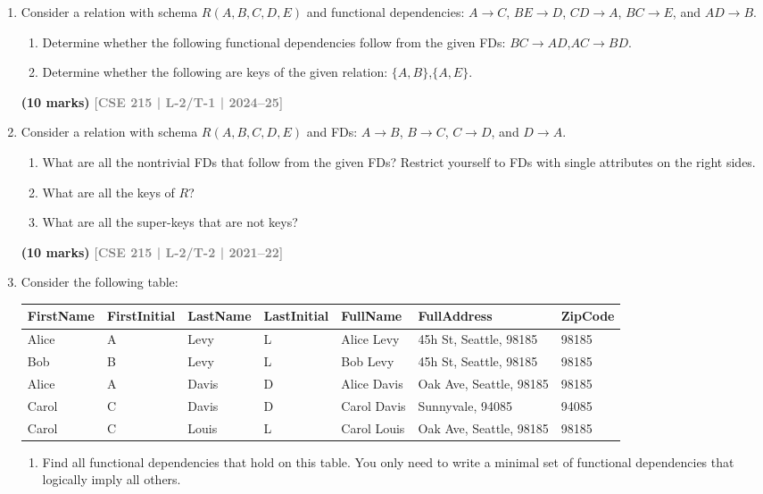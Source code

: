 \documentclass[12pt,a3paper]{article}
\newcommand{\yr}[1]{\hfill\textcolor{gray}{\small\textbf{[#1]}}}
\newcommand{\mk}[1]{\textcolor{orange!70!black}{\small\textbf{(#1 marks)}}}
\begin{document}
\begin{enumerate}

\item Consider a relation with schema $R(A,B,C,D,E)$ and functional dependencies: $A \to C$, $BE \to D$, $CD \to A$, $BC \to E$, and $AD \to B$.
\begin{enumerate}
  \item Determine whether the following functional dependencies follow from the given FDs: $BC \to AD$,\quad $AC \to BD$.
  \item Determine whether the following are keys of the given relation: $\{A,B\}$,\quad $\{A,E\}$.
\end{enumerate}
\mk{10} \yr{CSE 215 | L-2/T-1 | 2024--25}

\item Consider a relation with schema $R(A, B, C, D, E)$ and FDs: $A \to B$, $B \to C$, $C \to D$, and $D \to A$.
\begin{enumerate}
  \item What are all the nontrivial FDs that follow from the given FDs? Restrict yourself to FDs with single attributes on the right sides.
  \item What are all the keys of $R$?
  \item What are all the super-keys that are not keys?
\end{enumerate}
\mk{10} \yr{CSE 215 | L-2/T-2 | 2021--22}

\item Consider the following table:

\medskip
\begin{center}
\small
\begin{tabular}{lllllll}
\toprule
\textbf{FirstName} & \textbf{FirstInitial} & \textbf{LastName} & \textbf{LastInitial} & \textbf{FullName} & \textbf{FullAddress} & \textbf{ZipCode}\\
\midrule
Alice & A & Levy  & L & Alice Levy  & 45h St, Seattle, 98185 & 98185\\
Bob   & B & Levy  & L & Bob Levy    & 45h St, Seattle, 98185 & 98185\\
Alice & A & Davis & D & Alice Davis & Oak Ave, Seattle, 98185 & 98185\\
Carol & C & Davis & D & Carol Davis & Sunnyvale, 94085 & 94085\\
Carol & C & Louis & L & Carol Louis & Oak Ave, Seattle, 98185 & 98185\\
\bottomrule
\end{tabular}
\end{center}
\begin{enumerate}
\item Find all functional dependencies that hold on this table. You only need to write a minimal set of functional dependencies that logically imply all others.


\end{enumerate}
\end{enumerate}
\end{document}
